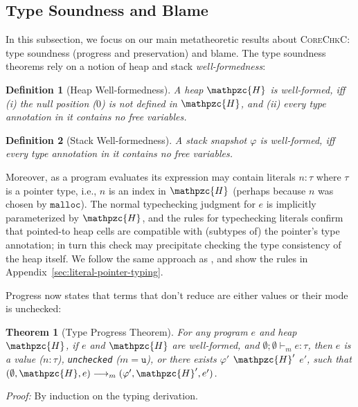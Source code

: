 \documentclass[conference]{IEEEtran}
\newcommand{\code}[1]{\lstinline|#1|}
\newcommand{\lang}{\textsc{CoreChkC}\xspace}
\newtheorem{defi}{Definition}
\newtheorem{thm}{Theorem}
\newcommand{\checkedc}{\text{Checked C}\xspace}
\newcommand{\evalue}[2]{\ensuremath{{#1}\!:\!{#2}}}
\newcommand{\heap}{\ensuremath{\mathpzc{H}}}
\newcommand{\umode}{\texttt{u}}
\begin{document}
\subsection{Type Soundness and Blame}\label{sec:theorem}



In this subsection, we focus on our main metatheoretic results about
\lang: type soundness (progress and preservation) and blame. The type
soundness theorems rely on a notion of heap and stack
\emph{well-formedness}:



\smallskip
\begin{defi}[Heap Well-formedness]
A heap $\heap$ is well-formed, iff (i) the null position
($0$) is not defined in $\heap$, and (ii) every type annotation in it
contains no free variables.
\end{defi}
\smallskip
\begin{defi}[Stack Well-formedness]
A stack snapshot $\varphi$ is well-formed, iff every type annotation in
it contains no free variables.
\end{defi}
\smallskip

Moreover, as a program evaluates its expression may contain literals
$n\!:\!\tau$ where $\tau$ is a pointer type, i.e., $n$ is an index in
$\heap$ (perhaps because $n$ was chosen by $\mathtt{malloc}$). The
normal typechecking judgment for $e$ is implicitly parameterized by
$\heap$, and the rules for typechecking literals confirm that
pointed-to heap cells are compatible with (subtypes of) the pointer's
type annotation; in turn this check may precipitate checking the type
consistency of the heap itself. We follow the same approach as
\citet{ruef18checkedc-incr}, and show the rules in
Appendix~\ref{sec:literal-pointer-typing}.


Progress now states that terms that don't reduce are either values or their
mode is unchecked:

\smallskip
\begin{thm}[Type Progress Theorem]\label{thm:progress}
For any \checkedc program $e$ and heap $\heap$, if $e$ and $\heap$ are
well-formed, and $\emptyset;\emptyset\vdash_m e : \tau$, then $e$ is
a value ($\evalue{n}{\tau}$), \code{unchecked} ($m=\umode$), or
there exists $\varphi'$ $\heap'$ $e'$, such that $(\emptyset,\heap,e)
\longrightarrow_m (\varphi',\heap',e')$.
\end{thm}
{\em Proof:} By induction on the typing derivation.

\smallskip
\end{document}
